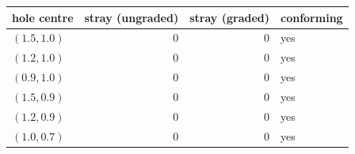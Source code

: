 \begin{tabular}{@{}l r r l@{}}
\toprule
hole centre & stray (ungraded) & stray (graded) & conforming \\
\midrule
$(1.5, 1.0)$ & 0 & 0 & yes \\
$(1.2, 1.0)$ & 0 & 0 & yes \\
$(0.9, 1.0)$ & 0 & 0 & yes \\
$(1.5, 0.9)$ & 0 & 0 & yes \\
$(1.2, 0.9)$ & 0 & 0 & yes \\
$(1.0, 0.7)$ & 0 & 0 & yes \\
\bottomrule
\end{tabular}
